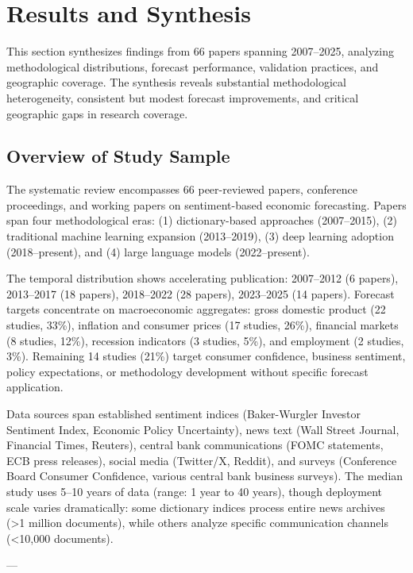 \documentclass[11pt]{article}
\begin{document}
\newpage
\section{Results and Synthesis}

This section synthesizes findings from 66 papers spanning 2007--2025, analyzing methodological distributions, forecast performance, validation practices, and geographic coverage. The synthesis reveals substantial methodological heterogeneity, consistent but modest forecast improvements, and critical geographic gaps in research coverage.

\subsection{Overview of Study Sample}

The systematic review encompasses 66 peer-reviewed papers, conference proceedings, and working papers on sentiment-based economic forecasting. Papers span four methodological eras: (1) dictionary-based approaches (2007--2015), (2) traditional machine learning expansion (2013--2019), (3) deep learning adoption (2018--present), and (4) large language models (2022--present). 

The temporal distribution shows accelerating publication: 2007--2012 (6 papers), 2013--2017 (18 papers), 2018--2022 (28 papers), 2023--2025 (14 papers). Forecast targets concentrate on macroeconomic aggregates: gross domestic product (22 studies, 33\%), inflation and consumer prices (17 studies, 26\%), financial markets (8 studies, 12\%), recession indicators (3 studies, 5\%), and employment (2 studies, 3\%). Remaining 14 studies (21\%) target consumer confidence, business sentiment, policy expectations, or methodology development without specific forecast application.

Data sources span established sentiment indices (Baker-Wurgler Investor Sentiment Index, Economic Policy Uncertainty), news text (Wall Street Journal, Financial Times, Reuters), central bank communications (FOMC statements, ECB press releases), social media (Twitter/X, Reddit), and surveys (Conference Board Consumer Confidence, various central bank business surveys). The median study uses 5--10 years of data (range: 1 year to 40 years), though deployment scale varies dramatically: some dictionary indices process entire news archives (>1 million documents), while others analyze specific communication channels (<10,000 documents).

---
\end{document}
